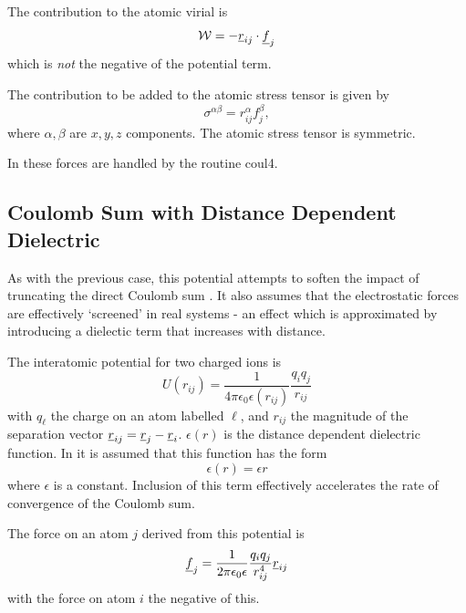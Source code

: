 The contribution to the atomic virial is
\begin{equation}
{\cal W}=-\mbox{$\underline{r}$}_{ij}\cdot\mbox{$\underline{f}$}_{j}
\end{equation}
which is {\em not} the negative of the potential term.

The contribution to be added to the atomic stress tensor is given by
\begin{equation}
\sigma^{\alpha \beta}=r_{ij}^{\alpha}f_{j}^{\beta},
\end{equation}
where $\alpha,\beta$ are $x,y,z$ components. The atomic stress tensor
is symmetric.

In \D{} these forces are handled by the routine {\sc coul4}.

\subsection{Coulomb Sum with Distance Dependent Dielectric}

As with the previous case, this potential attempts to soften the
impact of truncating the direct Coulomb sum
.
It also assumes that the electrostatic forces are effectively
`screened' in real systems - an effect which is approximated by
introducing a dielectic term that increases with distance.

The interatomic potential for two charged ions is
\begin{equation}
U(r_{ij})=\frac{1}{4\pi\epsilon_{0}\epsilon(r_{ij})}\frac{q_{i}q_{j}}{r_{ij}}
\end{equation}
with $q_{\ell}$ the charge on an atom labelled $\ell$, and $r_{ij}$
the magnitude of the separation vector
$\mbox{$\underline{r}$}_{ij}=\mbox{$\underline{r}$}_{j}-\mbox{$\underline{r}$}_{i}$. $\epsilon(r)$ is the
distance dependent dielectric
function. In \D{} it is assumed that this function has the form
\begin{equation}
\epsilon(r)=\epsilon r
\end{equation}
where $\epsilon$ is a constant. Inclusion of this term effectively
accelerates the rate of convergence of the Coulomb sum.

The force on an atom $j$ derived from this potential is
\begin{equation}
\mbox{$\underline{f}$}_{j}=\frac{1}{2\pi\epsilon_{0}\epsilon}\frac{q_{i}q_{j}}{r_{ij}^{4}}\mbox{$\underline{r}$}_{ij}
\end{equation}
with the force on atom $i$ the negative of this.

